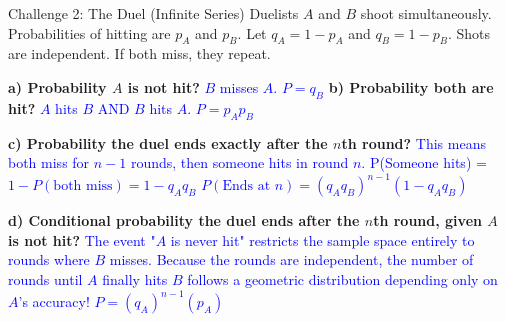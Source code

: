 \documentclass[aspectratio=169]{beamer}
\begin{document}
\begin{frame}{Challenge 2: The Duel (Infinite Series)}
    \small
    Duelists $A$ and $B$ shoot simultaneously. Probabilities of hitting are $p_A$ and $p_B$. Let $q_A = 1-p_A$ and $q_B = 1-p_B$. Shots are independent. If both miss, they repeat.
    
    \vspace{0.2cm}
    \textbf{a) Probability $A$ is not hit?} \pause \hfill \textcolor{blue}{$B$ misses $A$. $P = q_B$} \pause
    \newline \textbf{b) Probability both are hit?} \pause \hfill \textcolor{blue}{$A$ hits $B$ AND $B$ hits $A$. $P = p_A p_B$} \pause
    
    \vspace{0.2cm}
    \textbf{c) Probability the duel ends exactly after the $n$th round?} \pause
    \newline \textcolor{blue}{This means both miss for $n-1$ rounds, then someone hits in round $n$.}
    \newline \textcolor{blue}{P(Someone hits) = $1 - P(\text{both miss}) = 1 - q_A q_B$}
    \newline \textcolor{blue}{$P(\text{Ends at } n) = (q_A q_B)^{n-1} (1 - q_A q_B)$} \pause
    
    \vspace{0.2cm}
    \textbf{d) Conditional probability the duel ends after the $n$th round, given $A$ is not hit?} \pause
    \newline \textcolor{blue}{The event "$A$ is never hit" restricts the sample space entirely to rounds where $B$ misses. Because the rounds are independent, the number of rounds until $A$ finally hits $B$ follows a geometric distribution depending only on $A$'s accuracy!}
    \newline \textcolor{blue}{$P = (q_A)^{n-1} (p_A)$}
\end{frame}
\end{document}
